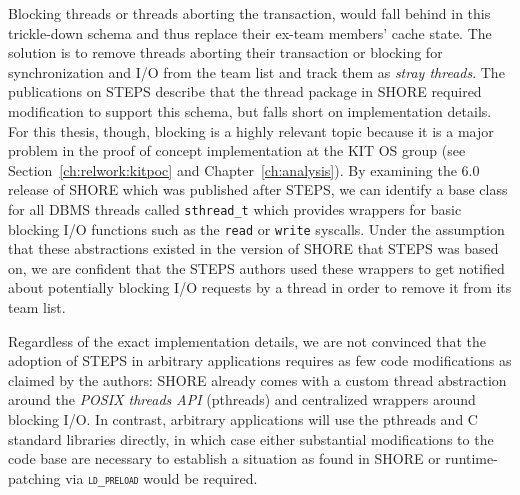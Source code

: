 \documentclass[12pt,a4paper]{book}
\begin{document}
Blocking threads or threads aborting the transaction, would fall behind in this trickle-down schema and thus replace their ex-team members' cache state.
The solution is to remove threads aborting their transaction or blocking for synchronization and I/O from the team list and track them as \emph{stray threads}.
The publications on STEPS describe that the thread package in SHORE required modification to support this schema, but falls short on implementation details.
For this thesis, though, blocking is a highly relevant topic because it is a major problem in the proof of concept implementation at the KIT OS group (see Section~\ref{ch:relwork:kitpoc} and Chapter~\ref{ch:analysis}).
By examining the 6.0 release of SHORE which was published after STEPS, we can identify a base class for all DBMS threads called \texttt{sthread\_t} which provides wrappers for basic blocking I/O functions such as the \texttt{read} or \texttt{write} syscalls.
Under the assumption that these abstractions existed in the version of SHORE that STEPS was based on, we are confident that the STEPS authors used these wrappers to get notified about potentially blocking I/O requests by a thread in order to remove it from its team list.~\cite{shoreRelease,shore}

Regardless of the exact implementation details, we are not convinced that the adoption of STEPS in arbitrary applications requires as few code modifications as claimed by the authors:
SHORE already comes with a custom thread abstraction around the \emph{POSIX threads API} (pthreads) and centralized wrappers around blocking I/O.
In contrast, arbitrary applications will use the pthreads and C standard libraries directly, in which case
either substantial modifications to the code base are necessary to establish a situation as found in SHORE
or runtime-patching via \textsc{\texttt{ld\_preload}} would be required.
\end{document}
